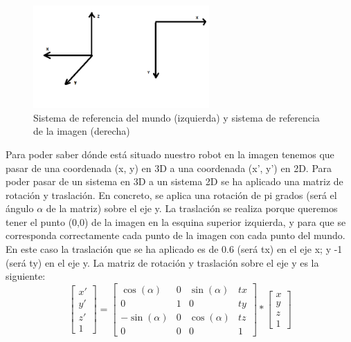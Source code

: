 \begin{figure}[H]
  \begin{center}
    \includegraphics[width=0.6\textwidth]{figures/Vacuum/SistemaRef_world_image.png}
		\caption{Sistema de referencia del mundo (izquierda) y sistema de referencia de la imagen (derecha)}
		\label{fig.sistemaref_world}
		\end{center}
\end{figure}

Para poder saber dónde está situado nuestro robot en la imagen tenemos que pasar de una coordenada (x, y) en 3D a una coordenada (x’, y’) en 2D. Para poder pasar de un sistema en 3D a un sistema 2D se ha aplicado una matriz de rotación y traslación. En concreto, se aplica una rotación de pi grados (será el ángulo \(\alpha\) de la matriz) sobre el eje y. La traslación se realiza porque queremos tener el punto (0,0) de la imagen en la esquina superior izquierda, y para que se corresponda correctamente cada punto de la imagen con cada punto del mundo. En este caso la traslación que se ha aplicado es de 0.6 (será tx) en el eje x; y -1 (será ty) en el eje y. La matriz de rotación y traslación sobre el eje y es la siguiente:\\

\begin{equation}
\left[\begin{array}{cc}
x' \\ 
y' \\
z' \\
1
\end{array}\right] = \left[\begin{array}{cccc}
\cos(\alpha) & 0 & \sin(\alpha) & tx \\ 
0 & 1 & 0 & ty\\
-\sin(\alpha) & 0 & \cos(\alpha) & tz \\
0 & 0 & 0 & 1
\end{array}\right]* \left[\begin{array}{cc}
x \\ 
y \\
z \\
1
\end{array}\right]
\end{equation}
\\

